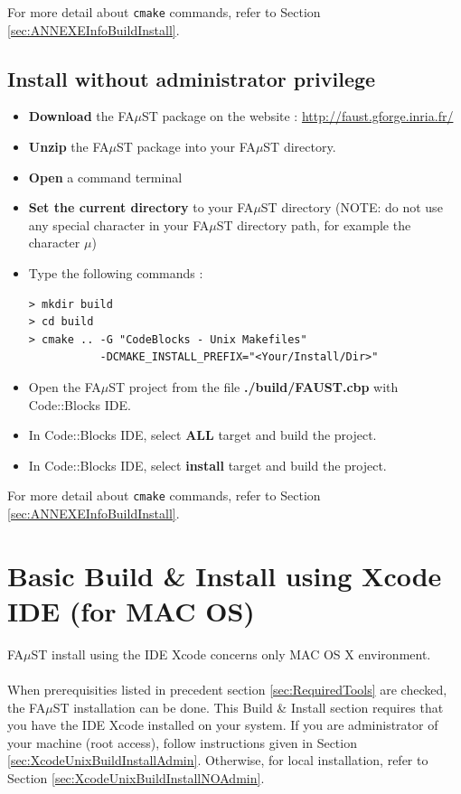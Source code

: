 For more detail about \texttt{cmake} commands, refer to Section \ref{sec:ANNEXEInfoBuildInstall}.


\subsection{Install without administrator privilege}\label{sec:CodeBlocUnixBuildInstallNOAdmin}
\begin{itemize}
\item \textbf{Download} the FA$\mu$ST package on the website :  \url{http://faust.gforge.inria.fr/}
\item \textbf{Unzip} the FA$\mu$ST package into your FA$\mu$ST directory.
\item \textbf{Open} a command terminal
\item \textbf{Set the current directory} to your FA$\mu$ST directory (NOTE: do not use any special character in your FA$\mu$ST directory path, for example the character $\mu$)
\item Type the following commands : 
\begin{lstlisting}
> mkdir build
> cd build
> cmake .. -G "CodeBlocks - Unix Makefiles"
  		   -DCMAKE_INSTALL_PREFIX="<Your/Install/Dir>"
\end{lstlisting}

\item Open the FA$\mu$ST project from the file \textbf{./build/FAUST.cbp} with Code::Blocks IDE. 
\item In Code::Blocks IDE, select \textbf{ALL} target and build the project. 
\item In Code::Blocks IDE, select \textbf{install} target and build the project. 
\end{itemize}

For more detail about \texttt{cmake} commands, refer to Section \ref{sec:ANNEXEInfoBuildInstall}.


\section{Basic Build \& Install using Xcode IDE (for MAC OS)}\label{sec:MacInstallXcode}

FA$\mu$ST install using the IDE Xcode concerns only MAC OS X environment.
\paragraph{}When prerequisities listed in precedent section \ref{sec:RequiredTools} are checked, the FA$\mu$ST installation can be done. This Build \& Install section requires that you have the IDE Xcode installed on your system. If you are administrator of your machine (root access), follow instructions given in Section \ref{sec:XcodeUnixBuildInstallAdmin}. Otherwise, for local installation, refer to Section \ref{sec:XcodeUnixBuildInstallNOAdmin}. 

